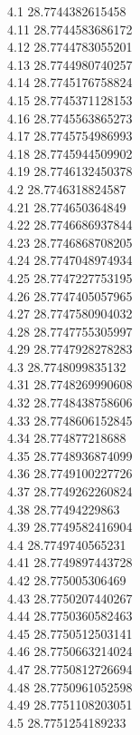 {4.1	28.7744382615458\\
4.11	28.7744583686172\\
4.12	28.7744783055201\\
4.13	28.7744980740257\\
4.14	28.7745176758824\\
4.15	28.7745371128153\\
4.16	28.7745563865273\\
4.17	28.7745754986993\\
4.18	28.7745944509902\\
4.19	28.7746132450378\\
4.2	28.7746318824587\\
4.21	28.774650364849\\
4.22	28.7746686937844\\
4.23	28.7746868708205\\
4.24	28.7747048974934\\
4.25	28.7747227753195\\
4.26	28.7747405057965\\
4.27	28.7747580904032\\
4.28	28.7747755305997\\
4.29	28.7747928278283\\
4.3	28.7748099835132\\
4.31	28.7748269990608\\
4.32	28.7748438758606\\
4.33	28.7748606152845\\
4.34	28.774877218688\\
4.35	28.7748936874099\\
4.36	28.7749100227726\\
4.37	28.7749262260824\\
4.38	28.77494229863\\
4.39	28.7749582416904\\
4.4	28.7749740565231\\
4.41	28.7749897443728\\
4.42	28.775005306469\\
4.43	28.7750207440267\\
4.44	28.7750360582463\\
4.45	28.7750512503141\\
4.46	28.7750663214024\\
4.47	28.7750812726694\\
4.48	28.7750961052598\\
4.49	28.7751108203051\\
4.5	28.7751254189233\\
}
